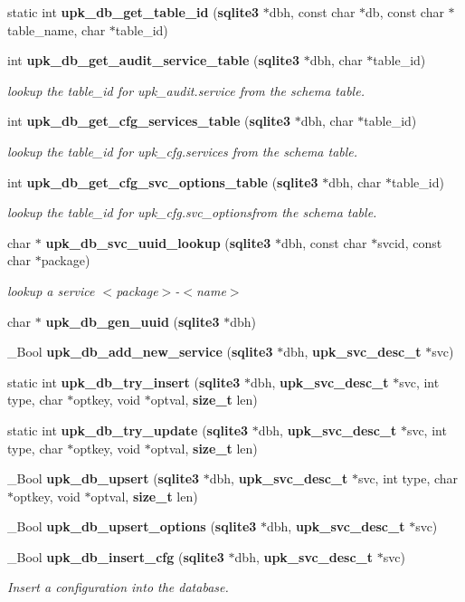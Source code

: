 \begin{DoxyCompactItemize}
static int {\bf upk\_\-db\_\-get\_\-table\_\-id} ({\bf sqlite3} $\ast$dbh, const char $\ast$db, const char $\ast$table\_\-name, char $\ast$table\_\-id)
\item 
int {\bf upk\_\-db\_\-get\_\-audit\_\-service\_\-table} ({\bf sqlite3} $\ast$dbh, char $\ast$table\_\-id)
\begin{DoxyCompactList}\small\item\em lookup the table\_\-id for upk\_\-audit.service from the schema table. \end{DoxyCompactList}\item 
int {\bf upk\_\-db\_\-get\_\-cfg\_\-services\_\-table} ({\bf sqlite3} $\ast$dbh, char $\ast$table\_\-id)
\begin{DoxyCompactList}\small\item\em lookup the table\_\-id for upk\_\-cfg.services from the schema table. \end{DoxyCompactList}\item 
int {\bf upk\_\-db\_\-get\_\-cfg\_\-svc\_\-options\_\-table} ({\bf sqlite3} $\ast$dbh, char $\ast$table\_\-id)
\begin{DoxyCompactList}\small\item\em lookup the table\_\-id for upk\_\-cfg.svc\_\-optionsfrom the schema table. \end{DoxyCompactList}\item 
char $\ast$ {\bf upk\_\-db\_\-svc\_\-uuid\_\-lookup} ({\bf sqlite3} $\ast$dbh, const char $\ast$svcid, const char $\ast$package)
\begin{DoxyCompactList}\small\item\em lookup a service $<$package$>$-\/$<$name$>$ \end{DoxyCompactList}\item 
char $\ast$ {\bf upk\_\-db\_\-gen\_\-uuid} ({\bf sqlite3} $\ast$dbh)
\item 
\_\-Bool {\bf upk\_\-db\_\-add\_\-new\_\-service} ({\bf sqlite3} $\ast$dbh, {\bf upk\_\-svc\_\-desc\_\-t} $\ast$svc)
\item 
static int {\bf upk\_\-db\_\-try\_\-insert} ({\bf sqlite3} $\ast$dbh, {\bf upk\_\-svc\_\-desc\_\-t} $\ast$svc, int type, char $\ast$optkey, void $\ast$optval, {\bf size\_\-t} len)
\item 
static int {\bf upk\_\-db\_\-try\_\-update} ({\bf sqlite3} $\ast$dbh, {\bf upk\_\-svc\_\-desc\_\-t} $\ast$svc, int type, char $\ast$optkey, void $\ast$optval, {\bf size\_\-t} len)
\item 
\_\-Bool {\bf upk\_\-db\_\-upsert} ({\bf sqlite3} $\ast$dbh, {\bf upk\_\-svc\_\-desc\_\-t} $\ast$svc, int type, char $\ast$optkey, void $\ast$optval, {\bf size\_\-t} len)
\item 
\_\-Bool {\bf upk\_\-db\_\-upsert\_\-options} ({\bf sqlite3} $\ast$dbh, {\bf upk\_\-svc\_\-desc\_\-t} $\ast$svc)
\item 
\_\-Bool {\bf upk\_\-db\_\-insert\_\-cfg} ({\bf sqlite3} $\ast$dbh, {\bf upk\_\-svc\_\-desc\_\-t} $\ast$svc)
\begin{DoxyCompactList}\small\item\em Insert a configuration into the database. \end{DoxyCompactList}\end{DoxyCompactItemize}
